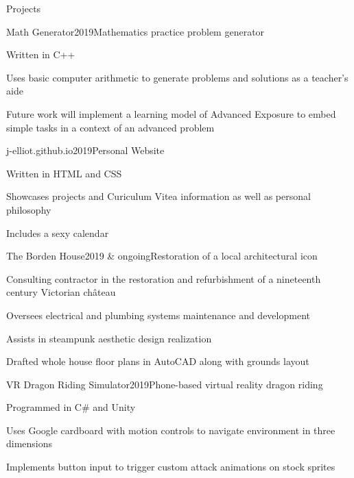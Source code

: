 \documentclass{resume} %
\begin{document}
\begin{rSection}{Projects}

\begin{rWorkSubsection}{Math Generator}{2019}{Mathematics practice problem generator}{}
\item Written in C++
\item Uses basic computer arithmetic to generate problems and solutions as a teacher's aide
\item Future work will implement a learning model of Advanced Exposure to embed simple tasks in a context of an advanced problem
\end{rWorkSubsection}


\begin{rWorkSubsection}{j-elliot.github.io}{2019}{Personal Website}{}
\item Written in HTML and CSS
\item Showcases projects and Curiculum Vitea information as well as personal philosophy
\item Includes a sexy calendar
\end{rWorkSubsection}

\iffalse
\begin{rWorkSubsection}{Curiculum Vitea}{2017 \& ongoing}{This resum\'{e} that you're reading right now!}{}
\item Written in \LaTeX
\item Uses custom .cls file to streamline parsing of broad CV into job-specific resum\'{e}s
\end{rWorkSubsection}
\fi

\begin{rWorkSubsection}{The Borden House}{2019 \& ongoing}{Restoration of a local architectural icon}{}
\item Consulting contractor in the restoration and refurbishment of a nineteenth century Victorian ch\^{a}teau
\item Oversees electrical and plumbing systems maintenance and development
\item Assists in steampunk aesthetic design realization
\item Drafted whole house floor plans in AutoCAD along with grounds layout
\end{rWorkSubsection}

\iffalse
\begin{rWorkSubsection}{VR Dragon Riding Simulator}{2019}{Phone-based virtual reality dragon riding}{}
\item Programmed in C\# and Unity
\item Uses Google cardboard with motion controls to navigate environment in three dimensions 
\item Implements button input to trigger custom attack animations on stock sprites
\end{rWorkSubsection}


\end{rSection}
\end{document}
